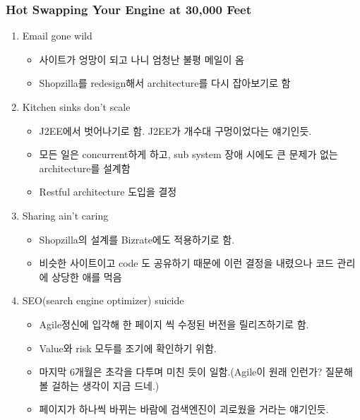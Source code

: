 \begin{frame}
\frametitle{Hot Swapping Your Engine at 30,000 Feet}

\begin{enumerate}
\item Email gone wild
    \begin{itemize}
    \item 사이트가 엉망이 되고 나니 엄청난 불평 메일이 옴
    \item Shopzilla를 redesign해서 architecture를 다시 잡아보기로 함
    \end{itemize}
\item Kitchen sinks don't scale
    \begin{itemize}
    \item J2EE에서 벗어나기로 함. J2EE가 개수대 구멍이었다는 얘기인듯.
    \item 모든 일은 concurrent하게 하고, sub system 장애 시에도 큰 문제가 없는 architecture를 설계함
    \item Restful architecture 도입을 결정
    \end{itemize}
\item Sharing ain't caring
    \begin{itemize}
    \item Shopzilla의 설계를 Bizrate에도 적용하기로 함.
    \item 비슷한 사이트이고 code 도 공유하기 때문에 이런 결정을 내렸으나 코드 관리에 상당한 애를 먹음
    \end{itemize}
\item SEO(search engine optimizer) suicide
    \begin{itemize}
    \item Agile정신에 입각해 한 페이지 씩 수정된 버전을 릴리즈하기로 함.
    \item Value와 risk 모두를 조기에 확인하기 위함.
    \item 마지막 6개월은 초각을 다투며 미친 듯이 일함.(Agile이 원래 인런가? 질문해 볼 걸하는 생각이 지금 드네.)
    \item 페이지가 하나씩 바뀌는 바람에 검색엔진이 괴로웠을 거라는 얘기인듯.
    \end{itemize}
\end{enumerate}
\end{frame}

